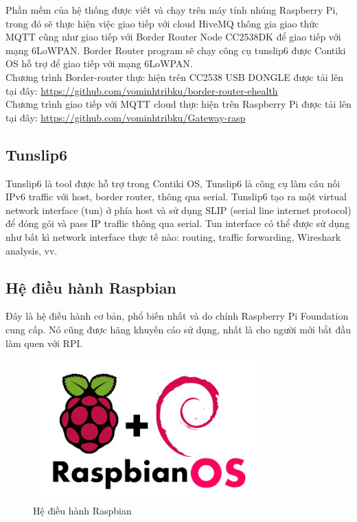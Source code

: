 \documentclass{report}
\begin{document}
Phần mềm của hệ thống được viết và chạy trên máy tính nhúng Raspberry Pi, trong đó sẽ
thực hiện việc giao tiếp với cloud HiveMQ thông gia giao thức MQTT cũng như giao tiếp với Border Router Node CC2538DK để giao tiếp với mạng 6LoWPAN. Border Router program sẽ chạy công cụ tunslip6 được Contiki OS hỗ trợ để giao tiếp với mạng 6LoWPAN. \\

Chương trình Border-router thực hiện trên CC2538 USB DONGLE được tải lên tại đây: \url{https://github.com/vominhtribku/border-router-ehealth} \\

Chương trình giao tiếp với MQTT cloud thực hiện trên Raspberry Pi được tải lên tại đây: \url{https://github.com/vominhtribku/Gateway-rasp}



\subsection{Tunslip6}
Tunslip6 là tool được hỗ trợ trong Contiki OS, Tunslip6 là công cụ làm câu nối IPv6 traffic
với host, border router, thông qua serial. Tunslip6 tạo ra một virtual network interface (tun) ở
phía host và sử dụng SLIP (serial line internet protocol) để đóng gói và pass IP traflic thông
qua serial. Tun interface có thể được sử dụng như bất kì network interface thực tế nào: routing,
traffic forwarding, Wireshark analysis, vv.
\subsection{Hệ điều hành Raspbian}
Đây là hệ điều hành cơ bản, phổ biến nhất và do chính Raspberry Pi Foundation cung cấp.
Nó cũng được hãng khuyến cáo sử dụng, nhất là cho người mới bắt đầu làm quen với RPI.
\begin{figure}[h]
	\centering
	\includegraphics[scale = 0.5]{fig50.png}
	\caption{Hệ điều hành Raspbian}
	\label{fig:Graph50}
\end{figure}
\end{document}
